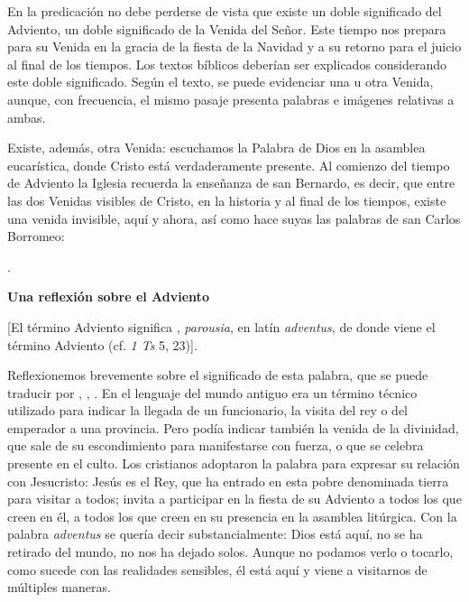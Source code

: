En la predicación no debe perderse de vista que existe un doble significado del Adviento, un doble significado de la Venida del Señor. Este tiempo nos prepara para su Venida en la gracia de la fiesta de la Navidad y a su retorno para el juicio al final de los tiempos. Los textos bíblicos deberían ser explicados considerando este doble significado. Según el texto, se puede evidenciar una u otra Venida, aunque, con frecuencia, el mismo pasaje presenta palabras e imágenes relativas a ambas.

Existe, además, otra Venida: escuchamos la Palabra de Dios en la asamblea eucarística, donde Cristo está verdaderamente presente. Al comienzo del tiempo de Adviento la Iglesia recuerda la enseñanza de san Bernardo, es decir, que entre las dos Venidas visibles de Cristo, en la historia y al final de los tiempos, existe una venida invisible, aquí y ahora, así como hace suyas las palabras de san Carlos Borromeo:

.

\textbf{Una reflexión sobre el Adviento}

{[}El término Adviento significa , \emph{parousia}, en latín \emph{adventus}, de donde viene el término Adviento (cf. \emph{1 Ts} 5, 23){]}.

Reflexionemos brevemente sobre el significado de esta palabra, que se puede traducir por , , . En el lenguaje del mundo antiguo era un término técnico utilizado para indicar la llegada de un funcionario, la visita del rey o del emperador a una provincia. Pero podía indicar también la venida de la divinidad, que sale de su escondimiento para manifestarse con fuerza, o que se celebra presente en el culto. Los cristianos adoptaron la palabra  para expresar su relación con Jesucristo: Jesús es el Rey, que ha entrado en esta pobre  denominada tierra para visitar a todos; invita a participar en la fiesta de su Adviento a todos los que creen en él, a todos los que creen en su presencia en la asamblea litúrgica. Con la palabra \emph{adventus} se quería decir substancialmente: Dios está aquí, no se ha retirado del mundo, no nos ha dejado solos. Aunque no podamos verlo o tocarlo, como sucede con las realidades sensibles, él está aquí y viene a visitarnos de múltiples maneras.

